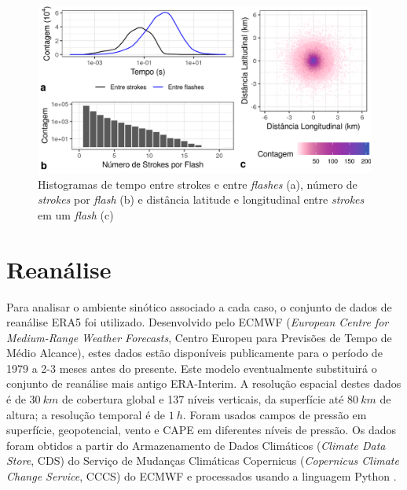 \begin{figure}[htb]
	\begin{center}
		\caption{Histogramas de tempo entre strokes e entre \textit{flashes} (a), número de \textit{strokes} por \textit{flash} (b) e distância latitude e longitudinal entre \textit{strokes} em um \textit{flash} (c)} 
		\label{flash_stats}
		\includegraphics[width=\columnwidth]{../Lightning_Processing/figures/brasildat_flash_stats_ptbr.png}
	\end{center}
\end{figure}

\section{Reanálise} \label{era5}

Para analisar o ambiente sinótico associado a cada caso, o conjunto de dados de reanálise ERA5 \cite{Copernicus2017} foi utilizado. Desenvolvido pelo ECMWF (\textit{European Centre for Medium-Range Weather Forecasts}, Centro Europeu para Previsões de Tempo de Médio Alcance), estes dados estão disponíveis publicamente para o período de 1979 a 2-3 meses antes do presente. Este modelo eventualmente substituirá o conjunto de reanálise mais antigo ERA-Interim. A resolução espacial destes dados é de $30\:km$ de cobertura global e 137 níveis verticais, da superfície até $80\:km$ de altura; a resolução temporal é de $1\:h$. Foram usados campos de pressão em superfície, geopotencial, vento e CAPE em diferentes níveis de pressão. Os dados foram obtidos a partir do Armazenamento de Dados Climáticos (\textit{Climate Data Store}, CDS) do Serviço de Mudanças Climáticas Copernicus (\textit{Copernicus Climate Change Service}, CCCS) do ECMWF e processados usando a linguagem Python \cite{PythonCoreTeam2018}.

